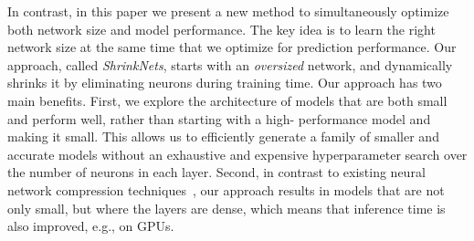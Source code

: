 In contrast, in this paper we present a new method to simultaneously optimize
both network size and model performance. The key idea is to learn the right
network size at the same time that we optimize for prediction performance. Our
approach, called {\it ShrinkNets}, starts with an {\it oversized} network, and
dynamically shrinks it by eliminating neurons during training time.  Our
approach has two main benefits.  First, we explore the architecture of models
that are both small and perform well, rather than starting with a high-
performance model and making it small.  This allows us to efficiently generate
a family of smaller and accurate models without an exhaustive and expensive
hyperparameter search over the number of neurons in each layer. Second, in
contrast to existing neural network compression techniques~\cite{Aghasi2016,han2015deepcompression}, our approach results in models that are
not only small, but where the  layers are dense, which means that inference
time is also improved, e.g., on GPUs.



